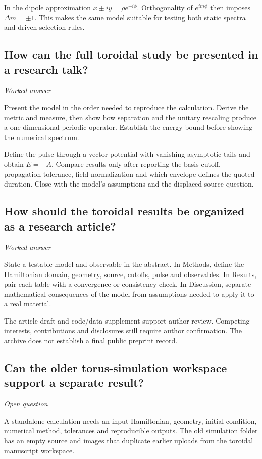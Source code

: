 \documentclass[11pt]{article}
\begin{document}
In the dipole approximation \(x\pm iy=\rho e^{\pm i\phi}\). Orthogonality of \(e^{im\phi}\) then imposes \(\Delta m=\pm1\). This makes the same model suitable for testing both static spectra and driven selection rules.

\subsection{How can the full toroidal study be presented in a research talk?}
\label{problem:torus-talk}
\textit{Worked answer}

Present the model in the order needed to reproduce the calculation. Derive the metric and measure, then show how separation and the unitary rescaling produce a one-dimensional periodic operator. Establish the energy bound before showing the numerical spectrum.

Define the pulse through a vector potential with vanishing asymptotic tails and obtain \(E=-\dot A\). Compare results only after reporting the basis cutoff, propagation tolerance, field normalization and which envelope defines the quoted duration. Close with the model's assumptions and the displaced-source question.

\subsection{How should the toroidal results be organized as a research article?}
\label{problem:torus-manuscript-structure}
\textit{Worked answer}

State a testable model and observable in the abstract. In Methods, define the Hamiltonian domain, geometry, source, cutoffs, pulse and observables. In Results, pair each table with a convergence or consistency check. In Discussion, separate mathematical consequences of the model from assumptions needed to apply it to a real material.

The article draft and code/data supplement support author review. Competing interests, contributions and disclosures still require author confirmation. The archive does not establish a final public preprint record.

\subsection{Can the older torus-simulation workspace support a separate result?}
\label{problem:torus-legacy}
\textit{Open question}

A standalone calculation needs an input Hamiltonian, geometry, initial condition, numerical method, tolerances and reproducible outputs. The old simulation folder has an empty source and images that duplicate earlier uploads from the toroidal manuscript workspace.
\end{document}
